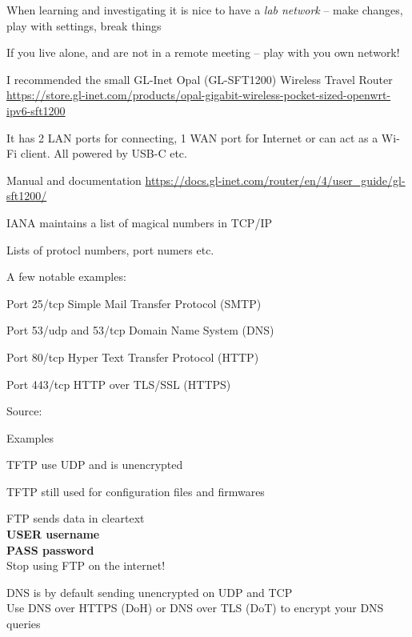 \documentclass[Screen16to9,17pt]{foils}
\begin{document}
\begin{list2}
\item When learning and investigating it is nice to have a \emph{lab network} -- make changes, play with settings, break things
\item If you live alone, and are not in a remote meeting -- play with you own network!
\item I recommended the small GL-Inet Opal (GL-SFT1200) Wireless Travel Router\\
\url{https://store.gl-inet.com/products/opal-gigabit-wireless-pocket-sized-openwrt-ipv6-sft1200}
\item It has 2 LAN ports for connecting, 1 WAN port for Internet or can act as a Wi-Fi client. All powered by USB-C etc.
\item Manual and documentation \url{https://docs.gl-inet.com/router/en/4/user_guide/gl-sft1200/}
\end{list2}





\begin{list1}
\item IANA maintains a list of magical numbers in TCP/IP
\item Lists of protocl numbers, port numers etc.
\item A few notable examples:
\begin{list2}
\item Port 25/tcp Simple Mail Transfer Protocol (SMTP)
\item Port 53/udp and 53/tcp Domain Name System (DNS)
\item Port 80/tcp Hyper Text Transfer Protocol (HTTP)
\item Port 443/tcp HTTP over TLS/SSL (HTTPS)
\end{list2}
\item Source: 
\end{list1}




Examples
\begin{list2}
\item TFTP use UDP and is unencrypted
\item TFTP still used for configuration files and firmwares
\item FTP sends data in cleartext\\
{\bfseries USER username}\\
{\bfseries PASS password}\\
Stop using FTP on the internet!
\item DNS is by default sending unencrypted on UDP and TCP\\
Use DNS over HTTPS (DoH) or DNS over TLS (DoT) to encrypt your DNS queries
\end{list2}
\end{document}
